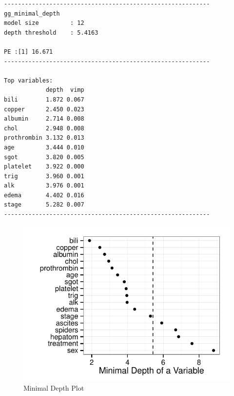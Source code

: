 \documentclass[nojss]{jss}
\begin{document}
\begin{knitrout}\footnotesize
{}\color{fgcolor}\begin{kframe}
\begin{verbatim}
-----------------------------------------------------------
gg_minimal_depth
model size         : 12 
depth threshold    : 5.4163 

PE :[1] 16.671
-----------------------------------------------------------

Top variables:
            depth  vimp
bili        1.872 0.067
copper      2.450 0.023
albumin     2.714 0.008
chol        2.948 0.008
prothrombin 3.132 0.013
age         3.444 0.010
sgot        3.820 0.005
platelet    3.922 0.000
trig        3.960 0.001
alk         3.976 0.001
edema       4.402 0.016
stage       5.282 0.007
-----------------------------------------------------------
\end{verbatim}
\end{kframe}
\end{knitrout}

\begin{knitrout}\footnotesize
{}\color{fgcolor}\begin{figure}[!htpb]

{\centering \includegraphics[width=\maxwidth]{figure/rfs-mindepth-plot-1} 

}

\caption[Minimal Depth Plot]{Minimal Depth Plot\label{fig:mindepth-plot}}
\end{figure}


\end{knitrout}
\end{document}
